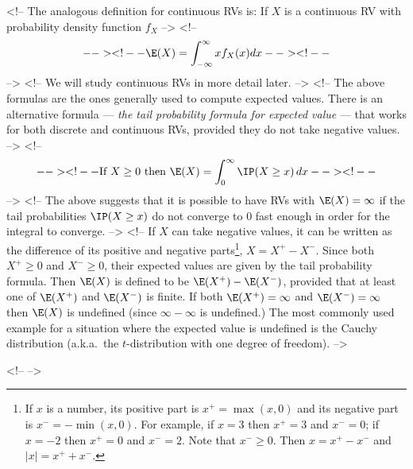 <!-- The analogous definition for continuous RVs is: If $X$ is a continuous RV with probability density function $f_X$ -->
<!-- \[ -->
<!-- \E(X) = \int_{-\infty}^{\infty} x f_X(x) dx -->
<!-- \] -->
<!-- We will study continuous RVs in more detail later. -->
<!-- The above formulas are the ones generally used to compute expected values.  There is an alternative formula --- \emph{the tail probability formula for expected value} --- that works for both discrete and continuous RVs, provided they do not take negative values. -->
<!-- \[ -->
<!-- \text{If $X \ge 0$ then } \E(X) = \int_0^\infty \IP(X\ge x)\, dx -->
<!-- \] -->
<!-- The above suggests that it is possible to have RVs with $\E(X)=\infty$ if the tail probabilities $\IP(X\ge x)$ do not converge to 0 fast enough in order for the integral to converge. -->
<!-- If $X$ can take negative values, it can be written as the difference of its positive and negative parts\footnote{If $x$ is a number, its positive part is $x^{+} = \max(x, 0)$ and its negative part is $x^{-} = -\min(x, 0)$.  For example, if $x=3$ then $x^{+}=3$ and $x^{-}=0$; if $x=-2$ then $x^{+}=0$ and $x^{-}=2$. Note that $x^{-}\ge0$.  Then $x=x^{+}-x^{-}$ and $|x| = x^{+}+x^{-}$. }, $X = X^{+} - X^{-}$.  Since both $X^{+}\ge0$ and $X^{-}\ge 0$, their expected values are given by the tail probability formula.  Then $\E(X)$ is defined to be $\E(X^{+})-\E(X^{-})$, provided that at least one of $\E(X^{+})$ and $\E(X^{-})$ is finite.  If both $\E(X^{+})=\infty$ and $\E(X^{-})=\infty$ then $\E(X)$ is undefined  (since $\infty - \infty$ is undefined.) The most commonly used example for a situation where the expected value is undefined is the Cauchy distribution (a.k.a.\ the $t$-distribution with one degree of freedom). -->



<!--  -->